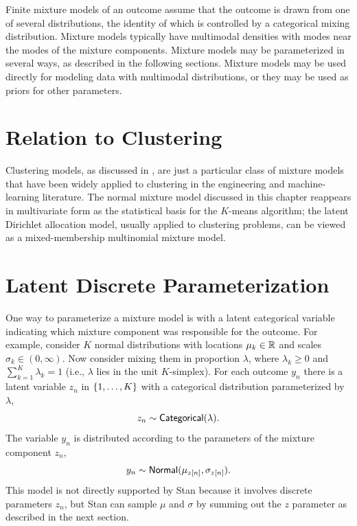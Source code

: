 \noindent
Finite mixture models of an outcome assume that the outcome is drawn
from one of several distributions, the identity of which is controlled
by a categorical mixing distribution.  Mixture models typically have
multimodal densities with modes near the modes of the mixture
components.  Mixture models may be parameterized in several ways, as
described in the following sections.  Mixture models may be used
directly for modeling data with multimodal distributions, or they may
be used as priors for other parameters.

\section{Relation to Clustering}\label{clustering-mixture.section}

Clustering models, as discussed in , are just a
particular class of mixture models that have been widely applied to
clustering in the engineering and machine-learning literature.  The
normal mixture model discussed in this chapter reappears in
multivariate form as the statistical basis for the $K$-means
algorithm;  the latent Dirichlet allocation model, usually applied to
clustering problems, can be viewed as a mixed-membership multinomial
mixture model.


\section{Latent Discrete Parameterization}

One way to parameterize a mixture model is with a latent categorical
variable indicating which mixture component was responsible for the
outcome. For example, consider $K$ normal distributions with locations
$\mu_k \in \mathbb{R}$ and scales $\sigma_k \in (0,\infty)$.  Now consider
mixing them in proportion $\lambda$, where $\lambda_k \geq 0$ and
$\sum_{k=1}^K \lambda_k = 1$ (i.e., $\lambda$ lies in the unit $K$-simplex).
For each outcome $y_n$ there is a latent variable $z_n$ in
$\{ 1,\ldots,K \}$ with a categorical distribution parameterized
by $\lambda$,
%
\[
z_n \sim \mbox{\sf Categorical}(\lambda).
\]
%
The variable $y_n$ is distributed according to the parameters
of the mixture component $z_n$,
\[
y_n \sim \mbox{\sf Normal}(\mu_{z[n]},\sigma_{z[n]}).
\]
%
This model is not directly supported by Stan because it involves
discrete parameters $z_n$, but Stan can sample $\mu$ and $\sigma$
by summing out the $z$ parameter as described in the next section.


